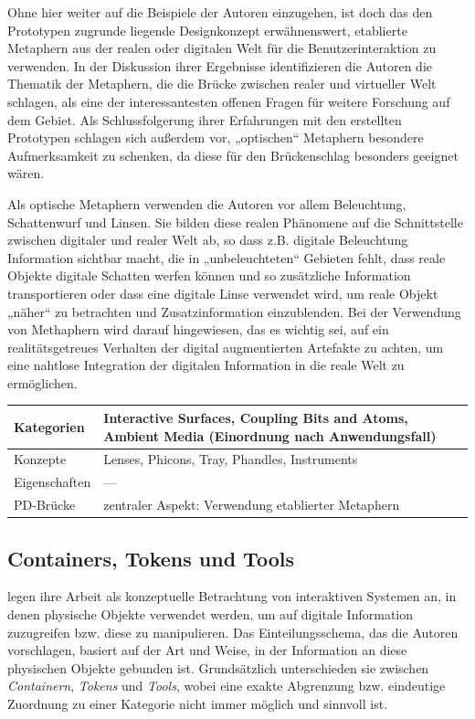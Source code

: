 Ohne hier weiter auf die Beispiele der Autoren einzugehen, ist doch das den Prototypen zugrunde liegende Designkonzept erwähnenswert, etablierte Metaphern aus der realen oder digitalen Welt für die Benutzerinteraktion zu verwenden. In der Diskussion ihrer Ergebnisse identifizieren die Autoren die Thematik der Metaphern, die die Brücke zwischen realer und virtueller Welt schlagen, als eine der interessantesten offenen Fragen für weitere Forschung auf dem Gebiet. Als Schlussfolgerung ihrer Erfahrungen mit den erstellten Prototypen schlagen sich außerdem vor, „optischen“ Metaphern besondere Aufmerksamkeit zu schenken, da diese für den Brückenschlag besonders geeignet wären. 

Als optische Metaphern verwenden die Autoren vor allem Beleuchtung, Schattenwurf und Linsen. Sie bilden diese realen Phänomene auf die Schnittstelle zwischen digitaler und realer Welt ab, so dass z.B. digitale Beleuchtung Information sichtbar macht, die in „unbeleuchteten“ Gebieten fehlt, dass reale Objekte digitale Schatten werfen können und so zusätzliche Information transportieren oder dass eine digitale Linse verwendet wird, um reale Objekt „näher“ zu betrachten und Zusatzinformation einzublenden. Bei der Verwendung von Methaphern wird darauf hingewiesen, das es wichtig sei, auf ein realitätsgetreues Verhalten der digital augmentierten Artefakte zu achten, um eine nahtlose Integration der digitalen Information in die reale Welt zu ermöglichen.

\begin{tabular}{| p{3cm} | p{10cm} |}
  \hline
  Kategorien & Interactive Surfaces, Coupling Bits and Atoms, Ambient Media (Einordnung nach Anwendungsfall) \\ \hline
  Konzepte & Lenses, Phicons, Tray, Phandles, Instruments \\ \hline
  Eigenschaften & --- \\ \hline
  PD-Brücke & zentraler Aspekt: Verwendung etablierter Metaphern \\ \hline
\end{tabular} 


\subsection{Containers, Tokens und Tools} %
\label{sub:containers_tokens_tools}

\citet{Holmquist99} legen ihre Arbeit als konzeptuelle Betrachtung von interaktiven Systemen an, in denen physische Objekte verwendet werden, um auf digitale Information zuzugreifen bzw. diese zu manipulieren. Das Einteilungsschema, das die Autoren vorschlagen, basiert auf der Art und Weise, in der Information an diese physischen Objekte gebunden ist. Grundsätzlich unterschieden sie zwischen \emph{Containern}, \emph{Tokens} und \emph{Tools}, wobei eine exakte Abgrenzung bzw. eindeutige Zuordnung zu einer Kategorie nicht immer möglich und sinnvoll ist.

